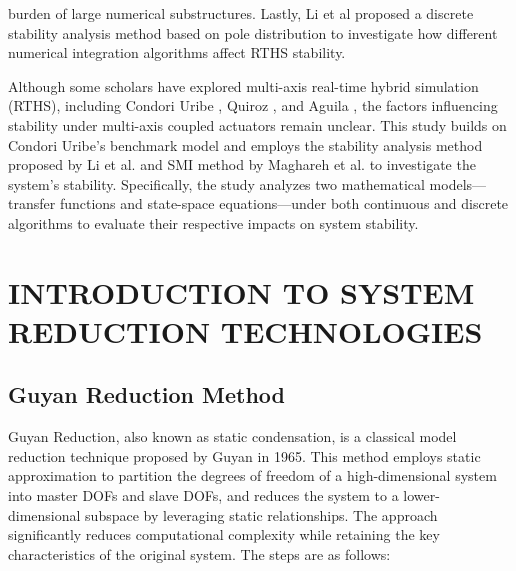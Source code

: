 \documentclass[a4paper, 10pt, conference]{ieeeconf}      %
\begin{document}
burden of large numerical substructures. Lastly, Li et al \cite{Li2021} proposed a discrete stability analysis method based on pole distribution to investigate how different numerical integration algorithms affect RTHS stability.

Although some scholars have explored multi-axis real-time hybrid simulation (RTHS), including Condori Uribe \cite{CondoriUribe2023}, Quiroz \cite{Quiroz2024}, and Aguila \cite{Aguila2024}, the factors influencing stability under multi-axis coupled actuators remain unclear. This study builds on Condori Uribe's benchmark model \cite{CondoriUribe2023} and employs the stability analysis method proposed by Li et al. \cite{Li2021} and SMI method by Maghareh et al. \cite{Maghareh2017} to investigate the system's stability. Specifically, the study analyzes two mathematical models—transfer functions and state-space equations—under both continuous and discrete algorithms to evaluate their respective impacts on system stability.


\section{INTRODUCTION TO SYSTEM REDUCTION TECHNOLOGIES} \label{sec2}

\subsection{Guyan Reduction Method} \label{sec21}

Guyan Reduction, also known as static condensation, is a classical model reduction technique proposed by Guyan in 1965. This method employs static approximation to partition the degrees of freedom of a high-dimensional system into master DOFs and slave DOFs, and reduces the system to a lower-dimensional subspace by leveraging static relationships. The approach significantly reduces computational complexity while retaining the key characteristics of the original system. The steps are as follows:
\end{document}
